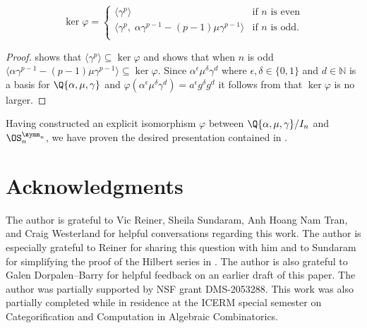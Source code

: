 \documentclass{amsart}
\begin{document}
\begin{lemma}\label{lemma:KerVarPhi}
    \[\ker \varphi =
    \begin{cases} \langle \gamma^p \rangle &\text{if $n$ is even}\\
    \langle \gamma^p,\; \alpha \gamma^{p-1} - (p-1)\mu \gamma^{p-1}\rangle &\text{if $n$ is odd.}\\
    \end{cases}\]
\end{lemma}
\begin{proof}
     shows that $\langle \gamma^p\rangle \subseteq \ker \varphi$ and  shows that when $n$ is odd $\langle \alpha \gamma^{p-1} - (p-1)\mu \gamma^{p-1}\rangle \subseteq \ker \varphi.$
    Since $\alpha^{\epsilon} \mu^\delta \gamma^d$ where $\epsilon, \delta \in \{0,1\}$ and $d \in \mathbb{N}$ is a basis for $\Q\{\alpha,\mu,\gamma\}$ and $\varphi(\alpha^{\epsilon} \mu^\delta \gamma^d) = a^{\epsilon} g^\delta g^d$ it follows from  that $\ker \varphi$ is no larger.
\end{proof}

Having constructed an explicit isomorphism $\varphi$ between $\Q\{\alpha,\mu,\gamma\}/I_n$ and $\OS_n^{\symm_n}$, we have proven the desired presentation contained in .

\section*{Acknowledgments}

The author is grateful to Vic Reiner, Sheila Sundaram, Anh Hoang Nam Tran, and Craig Westerland for helpful conversations regarding this work.
The author is especially grateful to Reiner for sharing this question with him and to Sundaram for simplifying the proof of the Hilbert series in .
The author is also grateful to Galen Dorpalen--Barry for helpful feedback on an earlier draft of this paper.
The author was partially supported by NSF grant DMS-2053288.
This work was also partially completed while in residence at the ICERM special semester on Categorification and Computation in Algebraic Combinatorics.


\end{document}
